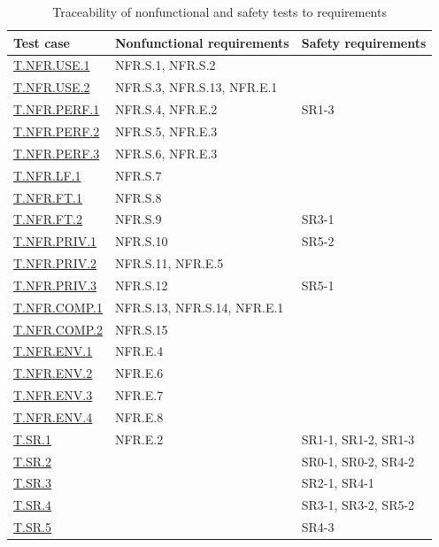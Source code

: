 \documentclass[12pt, titlepage]{article}
\begin{document}
\begin{table}[htbp]
\centering
\caption{Traceability of nonfunctional and safety tests to requirements}
\label{tab:trace-nfr}
\begin{tabularx}{\textwidth}{l>{\raggedright\arraybackslash}X>{\raggedright\arraybackslash}X}
\toprule
\textbf{Test case} & \textbf{Nonfunctional requirements} & \textbf{Safety requirements} \\
\midrule
\hyperref[T.NFR.USE.1]{T.NFR.USE.1} & NFR.S.1, NFR.S.2 & \\
\hyperref[T.NFR.USE.2]{T.NFR.USE.2} & NFR.S.3, NFR.S.13, NFR.E.1 & \\
\hyperref[T.NFR.PERF.1]{T.NFR.PERF.1} & NFR.S.4, NFR.E.2 & SR1-3 \\
\hyperref[T.NFR.PERF.2]{T.NFR.PERF.2} & NFR.S.5, NFR.E.3 & \\
\hyperref[T.NFR.PERF.3]{T.NFR.PERF.3} & NFR.S.6, NFR.E.3 & \\
\hyperref[T.NFR.LF.1]{T.NFR.LF.1} & NFR.S.7 & \\
\hyperref[T.NFR.FT.1]{T.NFR.FT.1} & NFR.S.8 & \\
\hyperref[T.NFR.FT.2]{T.NFR.FT.2} & NFR.S.9 & SR3-1 \\
\hyperref[T.NFR.PRIV.1]{T.NFR.PRIV.1} & NFR.S.10 & SR5-2 \\
\hyperref[T.NFR.PRIV.2]{T.NFR.PRIV.2} & NFR.S.11, NFR.E.5 & \\
\hyperref[T.NFR.PRIV.3]{T.NFR.PRIV.3} & NFR.S.12 & SR5-1 \\
\hyperref[T.NFR.COMP.1]{T.NFR.COMP.1} & NFR.S.13, NFR.S.14, NFR.E.1 & \\
\hyperref[T.NFR.COMP.2]{T.NFR.COMP.2} & NFR.S.15 & \\
\hyperref[T.NFR.ENV.1]{T.NFR.ENV.1} & NFR.E.4 & \\
\hyperref[T.NFR.ENV.2]{T.NFR.ENV.2} & NFR.E.6 & \\
\hyperref[T.NFR.ENV.3]{T.NFR.ENV.3} & NFR.E.7 & \\
\hyperref[T.NFR.ENV.4]{T.NFR.ENV.4} & NFR.E.8 & \\
\hyperref[T.SR.1]{T.SR.1} & NFR.E.2 & SR1-1, SR1-2, SR1-3 \\
\hyperref[T.SR.2]{T.SR.2} & & SR0-1, SR0-2, SR4-2 \\
\hyperref[T.SR.3]{T.SR.3} & & SR2-1, SR4-1 \\
\hyperref[T.SR.4]{T.SR.4} & & SR3-1, SR3-2, SR5-2 \\
\hyperref[T.SR.5]{T.SR.5} & & SR4-3 \\
\bottomrule
\end{tabularx}
\end{table}
\FloatBarrier
\end{document}
